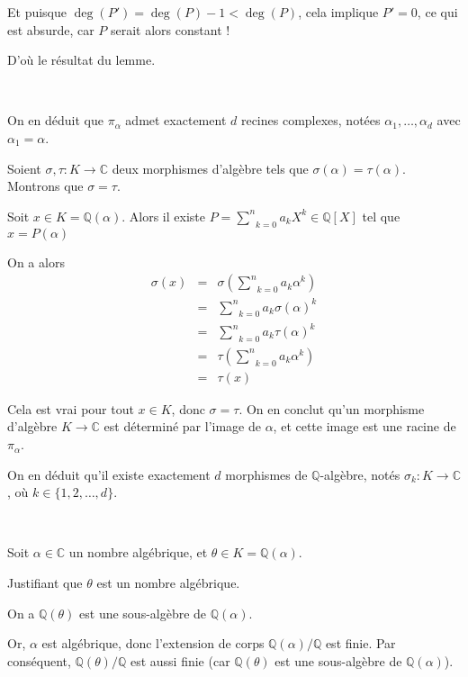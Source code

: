 Et puisque $\deg (P') = \deg (P) - 1 < \deg (P)$, cela implique $P' = 0$, ce
qui est absurde, car $P$ serait alors constant !

D'o{\`u} le r{\'e}sultat du lemme.

\

On en d{\'e}duit que $\pi_{\alpha}$ admet exactement $d$ recines complexes,
not{\'e}es $\alpha_1, \ldots, \alpha_d$ avec $\alpha_1 = \alpha$.

Soient $\sigma, \tau : K \rightarrow \mathbb{C}$ deux morphismes d'alg{\`e}bre
tels que $\sigma (\alpha) = \tau (\alpha)$. Montrons que $\sigma = \tau$.

Soit $x \in K =\mathbb{Q} (\alpha)$. Alors il existe $P = \underset{k =
0}{\overset{n}{\sum}} a_k X^k \in \mathbb{Q} [X]$ tel que $x = P (\alpha)$

On a alors
\begin{eqnarray*}
  \sigma (x) & = & \sigma \left( \underset{k = 0}{\overset{n}{\sum}} a_k
  \alpha^k \right)\\
  & = & \underset{k = 0}{\overset{n}{\sum}} a_k \sigma (\alpha)^k\\
  & = & \underset{k = 0}{\overset{n}{\sum}} a_k \tau (\alpha)^k\\
  & = & \tau \left( \underset{k = 0}{\overset{n}{\sum}} a_k \alpha^k
  \right)\\
  & = & \tau (x)
\end{eqnarray*}


Cela est vrai pour tout $x \in K$, donc $\sigma = \tau$. On en conclut qu'un
morphisme d'alg{\`e}bre $K \rightarrow \mathbb{C}$ est d{\'e}termin{\'e} par
l'image de $\alpha$, et cette image est une racine de $\pi_{\alpha}$.

On en d{\'e}duit qu'il existe exactement $d$ morphismes de
$\mathbb{Q}$-alg{\`e}bre, not{\'e}s $\sigma_k : K \rightarrow \mathbb{C}$,
o{\`u} $k \in \{ 1, 2, \ldots, d \}$.

\

 Soit $\alpha \in \mathbb{C}$ un nombre alg{\'e}brique, et
$\theta \in K =\mathbb{Q} (\alpha)$.

 Justifiant que $\theta$ est un nombre alg{\'e}brique.

On a $\mathbb{Q} (\theta)$ est une sous-alg{\`e}bre de $\mathbb{Q} (\alpha)$.

Or, $\alpha$ est alg{\'e}brique, donc l'extension de corps $\mathbb{Q}
(\alpha) /\mathbb{Q}$ est finie. Par cons{\'e}quent, $\mathbb{Q} (\theta)
/\mathbb{Q}$ est aussi finie (car $\mathbb{Q} (\theta)$ est une
sous-alg{\`e}bre de $\mathbb{Q} (\alpha)$).

